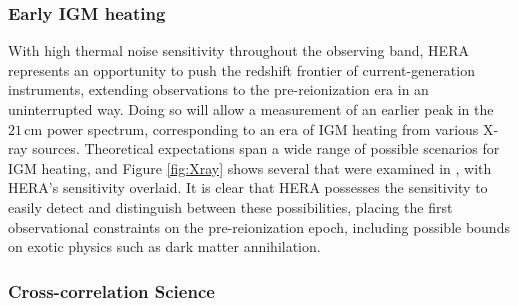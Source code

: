 \documentclass[preprint]{aastex}
\begin{document}

\subsubsection{Early IGM heating}

With high thermal noise sensitivity throughout the observing band, HERA represents an opportunity to push the redshift frontier of current-generation instruments, extending observations to the pre-reionization era in an uninterrupted way.  Doing so will allow a measurement of an earlier peak in the $21\,\textrm{cm}$ power spectrum, corresponding to an era of IGM heating from various X-ray sources.  Theoretical expectations span a wide range of possible scenarios for IGM heating, and Figure \ref{fig:Xray} shows several that were examined in \cite{mesinger_et_al2013}, with HERA's sensitivity overlaid.  It is clear that HERA possesses the sensitivity to easily detect and distinguish between these possibilities, placing the first observational constraints on the pre-reionization epoch, including possible bounds on exotic physics such as dark matter annihilation.



\subsubsection{Cross-correlation Science}
\end{document}
